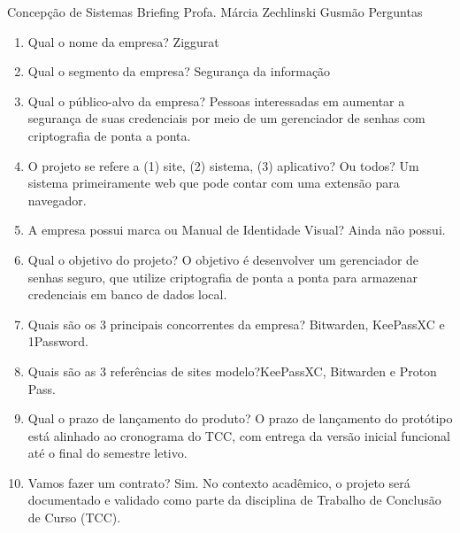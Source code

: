\documentclass[11pt]{article}
\date{\today}
\title{}
\begin{document}
\tableofcontents

Concepção de Sistemas
Briefing
Profa. Márcia Zechlinski Gusmão
Perguntas
\begin{enumerate}
\item Qual o nome da empresa? Ziggurat
\item Qual o segmento da empresa? Segurança da informação
\item Qual o público-alvo da empresa? Pessoas interessadas em aumentar a segurança de suas credenciais por meio de um gerenciador de senhas com criptografia de ponta a ponta.

\item O projeto se refere a (1) site, (2) sistema, (3) aplicativo? Ou todos? Um sistema primeiramente web que pode contar com uma extensão para navegador.
\item A empresa possui marca ou Manual de Identidade Visual? Ainda não possui.
\item Qual o objetivo do projeto? O objetivo é desenvolver um gerenciador de senhas seguro, que utilize criptografia de ponta a ponta para armazenar credenciais em banco de dados local.

\item Quais são os 3 principais concorrentes da empresa? Bitwarden, KeePassXC e 1Password.
\item Quais são as 3 referências de sites modelo?KeePassXC, Bitwarden e Proton Pass.
\item Qual o prazo de lançamento do produto? O prazo de lançamento do protótipo está alinhado ao cronograma do TCC, com entrega da versão inicial funcional até o final do semestre letivo.
\item Vamos fazer um contrato? Sim. No contexto acadêmico, o projeto será documentado e validado como parte da disciplina de Trabalho de Conclusão de Curso (TCC).
\end{enumerate}
\end{document}
